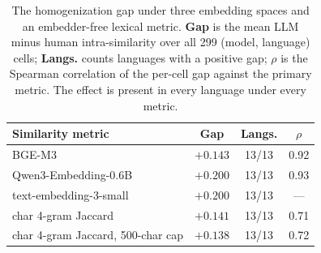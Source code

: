\begin{table}[t]
\centering
\small
\setlength{\tabcolsep}{4pt}
\begin{tabular}{@{}lccc@{}}
\toprule
\textbf{Similarity metric} & \textbf{Gap} & \textbf{Langs.} & \textbf{$\rho$} \\
\midrule
BGE-M3 & $+0.143$ & 13/13 & 0.92 \\
Qwen3-Embedding-0.6B & $+0.200$ & 13/13 & 0.93 \\
text-embedding-3-small & $+0.200$ & 13/13 & --- \\
char 4-gram Jaccard & $+0.141$ & 13/13 & 0.71 \\
char 4-gram Jaccard, 500-char cap & $+0.138$ & 13/13 & 0.72 \\
\bottomrule
\end{tabular}
\caption{The homogenization gap under three embedding spaces and an embedder-free lexical metric. \textbf{Gap} is the mean LLM minus human intra-similarity over all 299 (model, language) cells; \textbf{Langs.} counts languages with a positive gap; $\rho$ is the Spearman correlation of the per-cell gap against the primary metric. The effect is present in every language under every metric.}
\label{tab:robustness}
\end{table}